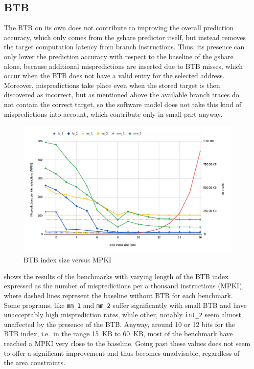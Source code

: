 \subsection{\acs{BTB}}
The \ac{BTB} on its own does not contribute to improving the overall prediction accuracy, which only comes from the gshare predictor itself, but instead removes the target computation latency from branch instructions. Thus, its presence can only lower the prediction accuracy with respect to the baseline of the gshare alone, because additional mispredictions are inserted due to \ac{BTB} misses, which occur when the \ac{BTB} does not have a valid entry for the selected address. Moreover, mispredictions take place even when the stored target is then discovered as incorrect, but as mentioned above the available branch traces do not contain the correct target, so the software model does not take this kind of mispredictions into account, which contribute only in small part anyway.
\begin{figure}[hbt]
  \centering
  \includegraphics[width=\textwidth]{img/btb_size.pdf}
  \caption{\acs{BTB} index size versus MPKI}
  \label{fig:btb_size}
\end{figure}

 shows the results of the benchmarks with varying length of the \ac{BTB} index expressed as the number of mispredictions per a thousand instructions (MPKI), where dashed lines represent the baseline without \ac{BTB} for each benchmark. Some programs, like \texttt{mm\_1} and \texttt{mm\_2} suffer significantly with small \acs{BTB} and have unacceptably high misprediction rates, while other, notably \texttt{int\_2} seem almost unaffected by the presence of the \ac{BTB}. Anyway, around 10 or 12 bits for the \ac{BTB} index, i.e.\ in the range \SI{15}{KB} to \SI{60}{KB}, most of the benchmark have reached a MPKI very close to the baseline. Going past these values does not seem to offer a significant improvement and thus becomes unadvisable, regardless of the area constraints.

